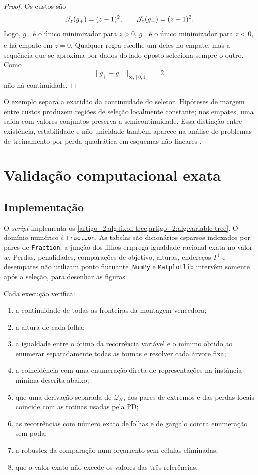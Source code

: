 \begin{proof}
Os custos são
\[
 \mathcal{J}_z(g_+)=(z-1)^2,\qquad
 \mathcal{J}_z(g_-)=(z+1)^2.
\]
Logo, $g_+$ é o único minimizador para $z>0$, $g_-$ é o único minimizador para
$z<0$, e há empate em $z=0$. Qualquer regra escolhe um deles no empate, mas a
sequência que se aproxima por dados do lado oposto seleciona sempre o outro.
Como
\[
 \|g_+-g_-\|_{\infty,[0,1]}=2,
\]
não há continuidade.
\end{proof}

O exemplo separa a exatidão da continuidade do seletor. Hipóteses de margem
entre custos produzem regiões de seleção localmente constante; nos empates,
uma saída com valores conjuntos preserva a semicontinuidade. Essa distinção entre
existência, estabilidade e não unicidade também aparece na análise de problemas
de treinamento por perda quadrática em esquemas não lineares
\citep{artigo_1-christof2021}.

\section{Validação computacional exata}
\label{artigo_2:sec:numerical}

\subsection{Implementação}

O \emph{script}
implementa os \cref{artigo_2:alg:fixed-tree,artigo_2:alg:variable-tree}. O domínio numérico é
\texttt{Fraction}. As tabelas são dicionários esparsos indexados
por pares de \texttt{Fraction}; a junção dos filhos emprega igualdade racional
exata no valor $w$. Perdas, penalidades, comparações de objetivo, alturas,
endereços $\Gamma^\sharp$ e desempates não utilizam ponto flutuante.
\texttt{NumPy} e \texttt{Matplotlib} intervêm somente após a seleção, para
desenhar as figuras.

Cada execução verifica:
\begin{enumerate}[label=(\alph*),leftmargin=2em]
 \item a continuidade de todas as fronteiras da montagem vencedora;
 \item a altura de cada folha;
 \item a igualdade entre o ótimo da recorrência variável e o mínimo obtido ao
 enumerar separadamente todas as formas e resolver cada árvore fixa;
 \item a coincidência com uma enumeração direta de representações na
 instância mínima descrita abaixo;
 \item que uma derivação separada de $\mathcal Q_H$, dos pares de extremos
 e das perdas locais coincide com as rotinas usadas pela PD;
 \item as recorrências com número exato de folhas e de gargalo contra
 enumeração sem poda;
 \item a robustez da comparação num orçamento sem células eliminadas;
 \item que o valor exato não excede os valores das três referências.
\end{enumerate}

